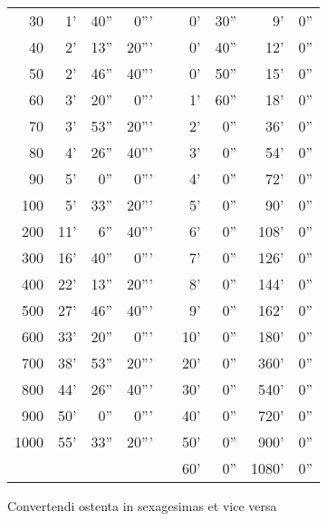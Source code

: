 \begin{tabular}{@{} r r r r  c r r r r }
  30 &  1' & 40'' &  0''' & &  0' & 30'' &    9' &   0'' \\
  40 &  2' & 13'' & 20''' & &  0' & 40'' &   12' &   0'' \\
  50 &  2' & 46'' & 40''' & &  0' & 50'' &   15' &   0'' \\
  60 &  3' & 20'' &  0''' & &  1' & 60'' &   18' &   0'' \\
  70 &  3' & 53'' & 20''' & &  2' &  0'' &   36' &   0'' \\
  80 &  4' & 26'' & 40''' & &  3' &  0'' &   54' &   0'' \\
  90 &  5' &  0'' &  0''' & &  4' &  0'' &   72' &   0'' \\
 100 &  5' & 33'' & 20''' & &  5' &  0'' &   90' &   0'' \\
 200 & 11' &  6'' & 40''' & &  6' &  0'' &  108' &   0'' \\
 300 & 16' & 40'' &  0''' & &  7' &  0'' &  126' &   0'' \\
 400 & 22' & 13'' & 20''' & &  8' &  0'' &  144' &   0'' \\
 500 & 27' & 46'' & 40''' & &  9' &  0'' &  162' &   0'' \\
 600 & 33' & 20'' &  0''' & & 10' &  0'' &  180' &   0'' \\
 700 & 38' & 53'' & 20''' & & 20' &  0'' &  360' &   0'' \\
 800 & 44' & 26'' & 40''' & & 30' &  0'' &  540' &   0'' \\
 900 & 50' &  0'' &  0''' & & 40' &  0'' &  720' &   0'' \\
1000 & 55' & 33'' & 20''' & & 50' &  0'' &  900' &   0'' \\
\multicolumn{4}{c}{}      & & 60' &  0'' & 1080' &   0'' \\
\bottomrule
\end{tabular}
%
\caption{Convertendi ostenta in sexagesimas et vice versa}
\label{tab:p006}
%
